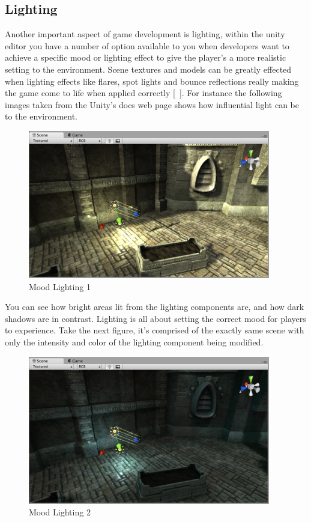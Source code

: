 \subsection{Lighting}
Another important aspect of game development is lighting, within the unity editor you have a number of option available to you when developers want to achieve a specific mood or lighting effect to give the player's a more realistic setting to the environment. Scene textures and models can be greatly effected when lighting effects like flares, spot lights and bounce reflections really making the game come to life when applied correctly [~\cite{Lighting}]. For instance the following images taken from the Unity's docs web page shows how influential light can be to the environment.

\begin{figure}[!ht]
	\caption{Mood Lighting 1}
	\centering
	\includegraphics{img/light-mood-1.png}
\end{figure}

You can see how bright areas lit from the lighting components are, and how dark shadows are in contrast. Lighting is all about setting the correct mood for players to experience. Take the next figure, it's comprised of the exactly same scene with only the intensity and color of the lighting component being modified.

\begin{figure}[!ht]
	\caption{Mood Lighting 2}
	\centering
	\includegraphics{img/light-mood-2.png}
\end{figure}

